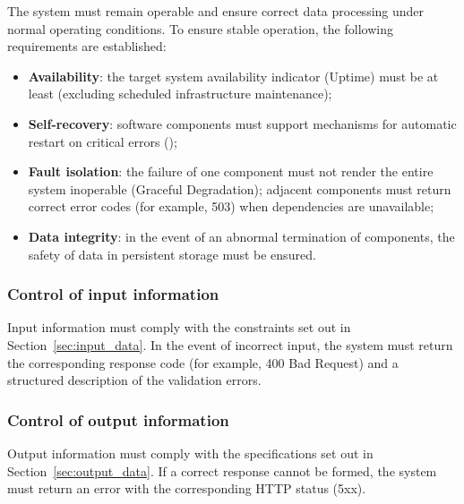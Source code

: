 \documentclass[12pt,a4paper]{extarticle}
\begin{document}
\begin{hseExample}
The system must remain operable and ensure correct data processing under normal operating conditions. To ensure stable operation, the following requirements are established:
\begin{itemize}[nosep, leftmargin=1.25cm]
    \item \textbf{Availability}: the target system availability indicator (Uptime) must be at least  (excluding scheduled infrastructure maintenance);
    \item \textbf{Self-recovery}: software components must support mechanisms for automatic restart on critical errors ();
    \item \textbf{Fault isolation}: the failure of one component must not render the entire system inoperable (Graceful Degradation); adjacent components must return correct error codes (for example, 503) when dependencies are unavailable;
    \item \textbf{Data integrity}: in the event of an abnormal termination of components, the safety of data in persistent storage must be ensured.
\end{itemize}
\end{hseExample}

\subsubsection{Control of input information}

\begin{hseExample}
Input information must comply with the constraints set out in Section~\ref{sec:input_data}. In the event of incorrect input, the system must return the corresponding response code (for example, 400 Bad Request) and a structured description of the validation errors.
\end{hseExample}

\subsubsection{Control of output information}

\begin{hseExample}
Output information must comply with the specifications set out in Section~\ref{sec:output_data}. If a correct response cannot be formed, the system must return an error with the corresponding HTTP status (5xx).
\end{hseExample}
\end{document}
